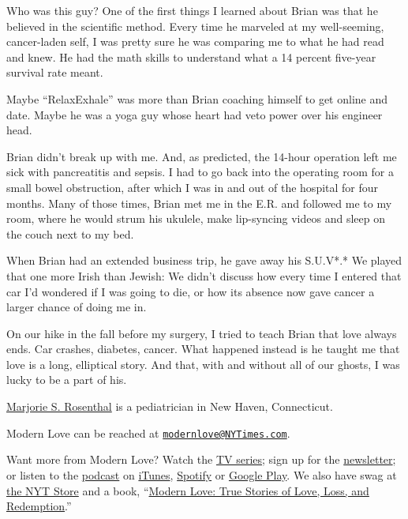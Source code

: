 Who was this guy? One of the first things I learned about Brian was that
he believed in the scientific method. Every time he marveled at my
well-seeming, cancer-laden self, I was pretty sure he was comparing me
to what he had read and knew. He had the math skills to understand what
a 14 percent five-year survival rate meant.

Maybe ``RelaxExhale'' was more than Brian coaching himself to get online
and date. Maybe he was a yoga guy whose heart had veto power over his
engineer head.

Brian didn't break up with me. And, as predicted, the 14-hour operation
left me sick with pancreatitis and sepsis. I had to go back into the
operating room for a small bowel obstruction, after which I was in and
out of the hospital for four months. Many of those times, Brian met me
in the E.R. and followed me to my room, where he would strum his
ukulele, make lip-syncing videos and sleep on the couch next to my bed.

When Brian had an extended business trip, he gave away his S.U.V*.* We
played that one more Irish than Jewish: We didn't discuss how every time
I entered that car I'd wondered if I was going to die, or how its
absence now gave cancer a larger chance of doing me in.

On our hike in the fall before my surgery, I tried to teach Brian that
love always ends. Car crashes, diabetes, cancer. What happened instead
is he taught me that love is a long, elliptical story. And that, with
and without all of our ghosts, I was lucky to be a part of his.

\href{https://twitter.com/marjoriesue}{Marjorie S. Rosenthal} is a
pediatrician in New Haven, Connecticut.

Modern Love can be reached at
\href{mailto:modernlove@NYTimes.com}{\nolinkurl{modernlove@NYTimes.com}}.

Want more from Modern Love? Watch the
\href{https://www.nytimes3xbfgragh.onion/2019/09/12/style/modern-love-tv-show-trailer.html}{TV
series}; sign up for the
\href{https://www.nytimes3xbfgragh.onion/newsletters/love-letter}{newsletter};
or listen to the
\href{https://www.nytimes3xbfgragh.onion/column/modern-love-podcast}{podcast}
on
\href{https://itunes.apple.com/us/podcast/modern-love/id1065559535?mt=2\&version=meter+at+0\&module=meter-Links\&pgtype=article\&contentId=\&mediaId=\&referrer=\&priority=true\&action=click\&contentCollection=meter-links-click}{iTunes},
\href{https://open.spotify.com/show/03Er7mSPq9IEewOgbPD3vO}{Spotify} or
\href{https://play.google.com/music/listen?u=0\#/ps/Iktqjbkz7bychbnofblw32dik64}{Google
Play}. We also have swag at
\href{https://store.nytimes3xbfgragh.onion/collections/modern-love}{the
NYT Store} and a book,
``\href{https://www.penguinrandomhouse.com/books/623036/modern-love-revised-and-updated-by-edited-by-daniel-jones-with-contributions-by-andrew-rannells-ayelet-waldman-amy-krouse-rosenthal-veronica-chambers-and-more/}{Modern
Love: True Stories of Love, Loss, and Redemption}.''

